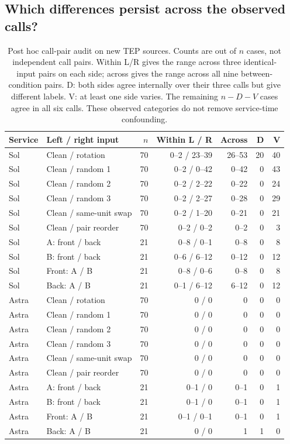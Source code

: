\documentclass[11pt,a4paper]{article}
\begin{document}
\subsection{Which differences persist across the observed calls?}
\begin{table}[htbp]\centering\small
\caption{Post hoc call-pair audit on new TEP sources. Counts are out of $n$ cases, not independent call pairs. Within L/R gives the range across three identical-input pairs on each side; across gives the range across all nine between-condition pairs. D: both sides agree internally over their three calls but give different labels. V: at least one side varies. The remaining $n-D-V$ cases agree in all six calls. These observed categories do not remove service-time confounding.}
\label{tab:repeat_separation}
\setlength{\tabcolsep}{4pt}
\begin{tabular}{@{}llrrrrr@{}}\toprule
Service & Left / right input & $n$ & Within L / R & Across & D & V \\\midrule
Sol & Clean / rotation & 70 & 0--2 / 23--39 & 26--53 & 20 & 40 \\
Sol & Clean / random 1 & 70 & 0--2 / 0--42 & 0--42 & 0 & 43 \\
Sol & Clean / random 2 & 70 & 0--2 / 2--22 & 0--22 & 0 & 24 \\
Sol & Clean / random 3 & 70 & 0--2 / 2--27 & 0--28 & 0 & 29 \\
Sol & Clean / same-unit swap & 70 & 0--2 / 1--20 & 0--21 & 0 & 21 \\
Sol & Clean / pair reorder & 70 & 0--2 / 0--2 & 0--2 & 0 & 3 \\
Sol & A: front / back & 21 & 0--8 / 0--1 & 0--8 & 0 & 8 \\
Sol & B: front / back & 21 & 0--6 / 6--12 & 0--12 & 0 & 12 \\
Sol & Front: A / B & 21 & 0--8 / 0--6 & 0--8 & 0 & 8 \\
Sol & Back: A / B & 21 & 0--1 / 6--12 & 6--12 & 0 & 12 \\
\midrule
Astra & Clean / rotation & 70 & 0 / 0 & 0 & 0 & 0 \\
Astra & Clean / random 1 & 70 & 0 / 0 & 0 & 0 & 0 \\
Astra & Clean / random 2 & 70 & 0 / 0 & 0 & 0 & 0 \\
Astra & Clean / random 3 & 70 & 0 / 0 & 0 & 0 & 0 \\
Astra & Clean / same-unit swap & 70 & 0 / 0 & 0 & 0 & 0 \\
Astra & Clean / pair reorder & 70 & 0 / 0 & 0 & 0 & 0 \\
Astra & A: front / back & 21 & 0--1 / 0 & 0--1 & 0 & 1 \\
Astra & B: front / back & 21 & 0--1 / 0 & 0--1 & 0 & 1 \\
Astra & Front: A / B & 21 & 0--1 / 0--1 & 0--1 & 0 & 1 \\
Astra & Back: A / B & 21 & 0 / 0 & 1 & 1 & 0 \\
\bottomrule\end{tabular}\end{table}
\end{document}
